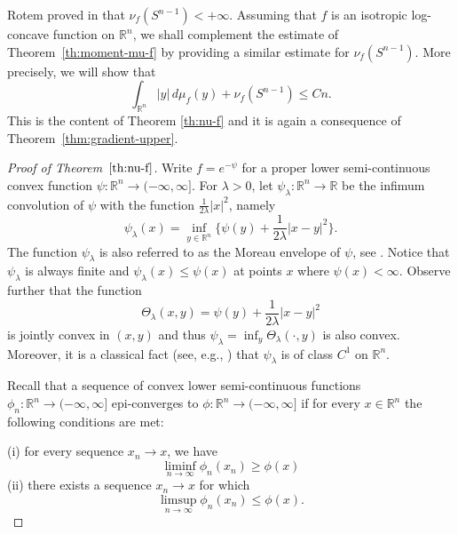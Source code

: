 \documentclass[11pt,leqno]{article}
\theoremstyle{definition}
\theoremstyle{remark}
\numberwithin{equation}{section}
\newcommand{\ls}{\leqslant}
\newcommand{\gr}{\geqslant}
\newcommand{\1}{\textbf{1}}
\newcommand{\R}{\mathbb{R}}
\begin{document}
Rotem proved in \cite[Proposition~1.6]{Rotem-2023} that $\nu_f(S^{n-1})<+\infty$. Assuming that $f$ is an isotropic log-concave function on $\mathbb{R}^n$, 
we shall complement the estimate of Theorem~\ref{th:moment-mu-f} by providing a similar estimate for $\nu_f(S^{n-1})$. More precisely, we will show that
$$\int_{\R^n} |y|\, d\mu_f(y) + \nu_f(S^{n-1}) \leq Cn .$$
This is the content of Theorem \ref{th:nu-f} and it is again a consequence of Theorem~\ref{thm:gradient-upper}.

\begin{proof}[Proof of Theorem~$\ref{th:nu-f}$]
Write $f=e^{-\psi}$ for a proper lower semi-continuous convex function $\psi:\R^n\to(-\infty,\infty]$. For $\lambda>0$,
let $\psi_\lambda:\R^n\to\R$ be the infimum convolution of $\psi$ with the function $\frac{1}{2\lambda}|x|^2$, namely
$$\psi_\lambda(x) = \inf_{y\in\R^n} \Big\{ \psi(y) + \frac{1}{2\lambda} |x-y|^2\Big\}.$$
The function  $\psi_\lambda$ is also referred to as the Moreau envelope of $\psi$, see \cite[Definition~1.22]{RW98}. Notice that $\psi_\lambda$ is always finite and $\psi_\lambda(x) \ls \psi(x)$ at points $x$ where $\psi(x)<\infty$. Observe further that the function
$$\Theta_\lambda (x,y) = \psi(y) + \frac{1}{2\lambda} |x-y|^2$$
is jointly convex in $(x,y)$ and thus $\psi_\lambda = \inf_y \Theta_\lambda(\cdot,y)$ is also convex. Moreover, it is a classical fact (see, e.g., \cite[Theorem~2.26 (b)]{RW98}) that $\psi_\lambda$ is of class $C^1$ on $\R^n$.

Recall that a sequence of convex lower semi-continuous functions $\phi_n:\R^n\to(-\infty,\infty]$
epi-converges to $\phi:\R^n\to(-\infty,\infty]$ if for every $x\in\R^n$ the following conditions are met:

\smallskip

\noindent (i) for every sequence $x_n\to x$, we have
$$\liminf_{n\to\infty} \phi_n(x_n) \gr \phi(x)$$
\noindent (ii) there exists a sequence $x_n\to x$ for which
$$\limsup_{n\to\infty} \phi_n(x_n) \ls \phi(x).$$


\end{proof}
\end{document}
